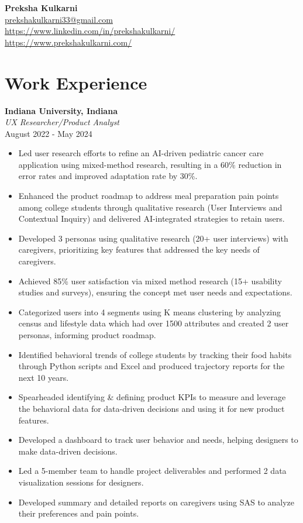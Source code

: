 \documentclass[a4paper,10pt]{article}
\begin{document}
\begin{center}
    {\LARGE \textbf{Preksha Kulkarni}}\\
    \href{mailto:prekshakulkarni33@gmail.com}{prekshakulkarni33@gmail.com} \\
    \href{https://www.linkedin.com/in/prekshakulkarni/}{https://www.linkedin.com/in/prekshakulkarni/} \\
    \href{https://www.prekshakulkarni.com/}{https://www.prekshakulkarni.com/}
\end{center}

\vspace{0.5cm}

\section*{Work Experience}

\textbf{Indiana University, Indiana} \\
\textit{UX Researcher/Product Analyst} \\
August 2022 - May 2024
\begin{itemize}[left=0.15cm]
    \item Led user research efforts to refine an AI-driven pediatric cancer care application using mixed-method research, resulting in a 60\% reduction in error rates and improved adaptation rate by 30\%.
    \item Enhanced the product roadmap to address meal preparation pain points among college students through qualitative research (User Interviews and Contextual Inquiry) and delivered AI-integrated strategies to retain users.
    \item Developed 3 personas using qualitative research (20+ user interviews) with caregivers, prioritizing key features that addressed the key needs of caregivers.
    \item Achieved 85\% user satisfaction via mixed method research (15+ usability studies and surveys), ensuring the concept met user needs and expectations.
    \item Categorized users into 4 segments using K means clustering by analyzing census and lifestyle data which had over 1500 attributes and created 2 user personas, informing product roadmap.
    \item Identified behavioral trends of college students by tracking their food habits through Python scripts and Excel and produced trajectory reports for the next 10 years.
    \item Spearheaded identifying \& defining product KPIs to measure and leverage the behavioral data for data-driven decisions and using it for new product features.
    \item Developed a dashboard to track user behavior and needs, helping designers to make data-driven decisions.
    \item Led a 5-member team to handle project deliverables and performed 2 data visualization sessions for designers.
    \item Developed summary and detailed reports on caregivers using SAS to analyze their preferences and pain points.
\end{itemize}
\end{document}
